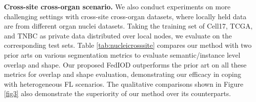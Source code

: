 \documentclass[letterpaper]{article} %
\begin{document}
\textbf{Cross-site cross-organ scenario.}
We also conduct experiments on more challenging settings with cross-site cross-organ datasets, where locally held data are from different organ nuclei datasets. 
Taking the training set of Cell17, TCGA, and TNBC as private data distributed over local nodes, we evaluate on the corresponding test sets. %
Table \ref{tab:nucleicrosssite} compares our method with two prior arts \cite{chang2020synthetic, mcmahan2017communication} on various segmentation metrics to evaluate semantic/instance level overlap and shape. 
Our proposed FedIOD outperforms the prior art on all these metrics for overlap and shape evaluation, 
demonstrating our efficacy in coping with heterogeneous FL scenarios. The qualitative comparisons shown in Figure \ref{fig3} also demonstrate the superiority of our method over its counterparts. 

\begin{table}[h]
    \centering
\noindent\caption{Compare FedIOD and FedKD in terms of accuracy (\%) on CIFAR10 ($K$=20, $\alpha$=1) under same privacy cost. %
} 
\label{tab:privacy-utility}
\end{table}
\end{document}
